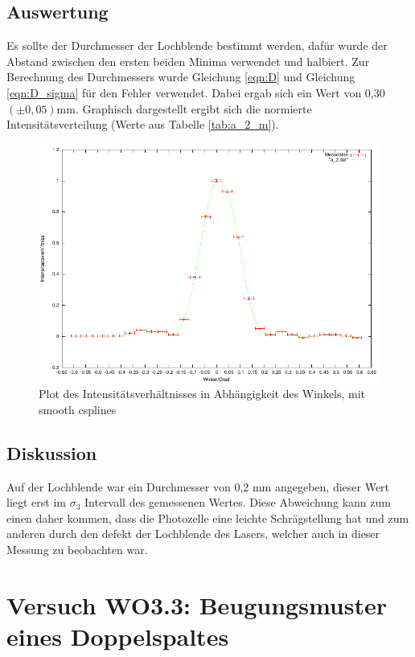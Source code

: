 \documentclass[12pt]{scrartcl}
\begin{document}
\subsection{Auswertung}
Es sollte der Durchmesser der Lochblende bestimmt werden, dafür wurde der Abstand zwischen den ersten beiden Minima verwendet und halbiert. Zur Berechnung des Durchmessers wurde Gleichung \ref{eqn:D} und Gleichung \ref{eqn:D_sigma} für den Fehler verwendet. Dabei ergab sich ein Wert von 0,30 $(\pm 0,05)$mm. Graphisch dargestellt ergibt sich die normierte Intensitätsverteilung (Werte aus Tabelle \ref{tab:a_2_m}).

\begin{figure}[H]
\centering
    \includegraphics[scale = 1]{a_2.pdf}
  	\caption[Plot des Intensitätsverhältnisses in Abhängigkeit des Winkels, mit theoretischer Vorhersage]{Plot des Intensitätsverhältnisses in Abhängigkeit des Winkels, mit smooth csplines}
  \label{fig:a_2}
\end{figure}

\subsection{Diskussion}
Auf der Lochblende war ein Durchmesser von 0,2 mm angegeben, dieser Wert liegt erst im $\sigma_3$ Intervall des gemessenen Wertes. Diese Abweichung kann zum einen daher kommen, dass die Photozelle eine leichte Schrägstellung hat und zum anderen durch den defekt der Lochblende des Lasers, welcher auch in dieser Messung zu beobachten war.


\section{Versuch WO3.3: Beugungsmuster eines Doppelspaltes}
\end{document}
